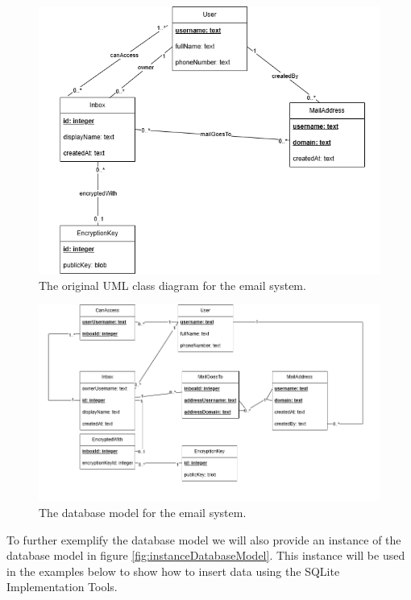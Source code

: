 \documentclass[a4paper,11pt,oneside]{article}
\begin{document}
\begin{sloppypar}
\begin{figure}[htb]
    \centering
    \includegraphics[width=1\textwidth]{model/original_uml_class_diagram.png}
    \caption{The original UML class diagram for the email system.}
    \label{fig:originalUMLClassDiagram}
\end{figure}

\begin{figure}[htb]
    \centering
    \includegraphics[width=1\textwidth]{model/database_friendly.png}
    \caption{The database model for the email system.}
    \label{fig:originalDatabaseModel}
\end{figure}

To further exemplify the database model we will also provide an instance of the database model in figure \autoref{fig:instanceDatabaseModel}. This instance will be used in the examples below to show how to insert data using the SQLite Implementation Tools.


\end{sloppypar}
\end{document}
